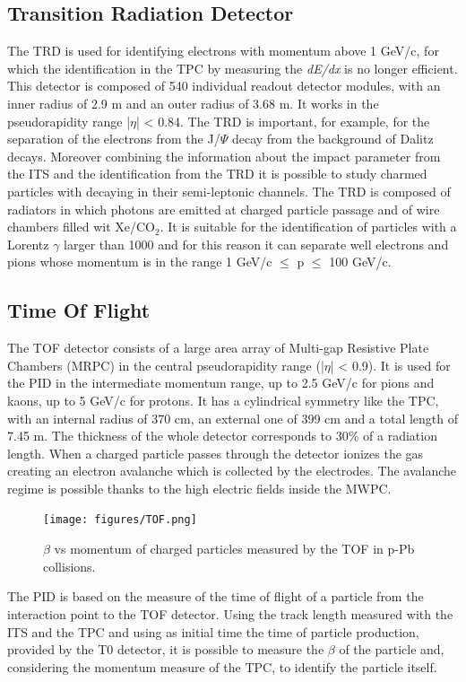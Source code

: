 \subsection*{Transition Radiation Detector}
The TRD is used for identifying electrons with momentum above 1 GeV/c, for which the identification in the TPC by measuring the \textit{dE/dx} is no longer efficient. This detector is composed of 540 individual readout detector modules, with an inner radius of 2.9 m and an outer radius of 3.68 m. It works in the pseudorapidity range |$\eta$| < 0.84. The TRD is important, for example, for the separation of the electrons from the J/$\Psi$ decay from the background of Dalitz decays. Moreover combining the information about the impact parameter from the ITS and the identification from the TRD it is possible to study charmed particles with decaying in their semi-leptonic channels. The TRD is composed of radiators in which photons are emitted at charged particle passage and of wire chambers filled wit Xe/CO$_2$. It is suitable for the identification of particles with a Lorentz $\gamma$ larger than 1000 and for this reason it can separate well electrons and pions whose momentum is in the range 1 GeV/c $\leq$ p $\leq$ 100 GeV/c.
\subsection*{Time Of Flight}
The TOF detector consists of a large area array of Multi-gap Resistive Plate Chambers (MRPC) in the central pseudorapidity range (|$\eta$| < 0.9). It is used for the PID in the intermediate momentum range, up to 2.5 GeV/c for pions and kaons, up to 5 GeV/c for protons. It has a cylindrical symmetry like the TPC, with an internal radius of 370 cm, an external one of 399 cm and a total length of 7.45 m. The thickness of the whole detector corresponds to 30\% of a radiation length. When a charged particle passes through the detector ionizes the gas creating an electron avalanche which is collected by the electrodes. The avalanche regime is possible thanks to the high electric fields inside the MWPC.\\
%
\begin{figure}
  \centering
  \texttt{[image: figures/TOF.png]}
  \caption{$\beta$ vs momentum of charged particles measured by the TOF in p-Pb collisions.}
  \label{fig:TOF}
\end{figure}
%
The PID is based on the measure of the time of flight of a particle from the interaction point to the TOF detector. Using the track length measured with the ITS and the TPC and using as initial time the time of particle production, provided by the T0 detector, it is possible to measure the $\beta$ of the particle and, considering the momentum measure of the TPC, to identify the particle itself.\\
